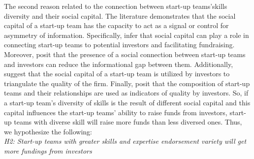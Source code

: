 \documentclass[12pt]{article}
\begin{document}
The second reason related to the connection between start-up teams'skills diversity and their social capital. The literature demonstrates that the social capital of a start-up team has the capacity to act as a signal or control for asymmetry of information. Specifically, \citet{shane2002network} infer that social capital can play a role in connecting start-up teams to potential investors and facilitating fundraising. Moreover, \citet{huang2017resources, shane2002organizational} posit that the presence of a social connection between start-up teams and investors can reduce the informational gap between them. Additionally, \citet{hoenig2015quality} suggest that the social capital of a start-up team is utilized by investors to triangulate the quality of the firm. Finally, \citet{plummer2016better, semrau2014exactly} posit that the composition of start-up teams and their relationships are used as indicators of quality by investors. So, if a start-up team's diversity of skills is the result of different social capital and this capital influences the start-up teams' ability to raise funds from investors, start-up teams with diverse skill will raise more funds than less diversed ones. Thus, we hypothesize the following: \\

\noindent \textit{H2: Start-up teams with greater skills and expertise endorsement variety will get more fundings from investors} \\

\end{document}
